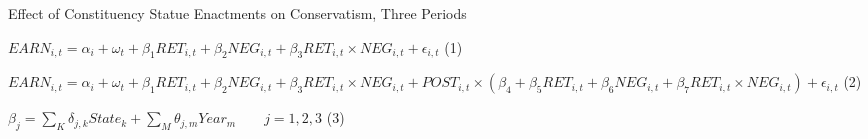 \begin{landscape}
	\begin{table}[H]
		\centering
		\caption{Effect of Constituency Statue Enactments on Conservatism, Three Periods}
		$EARN_{i,t}=\alpha_i+\omega_t+\beta_1RET_{i,t}+\beta_2NEG_{i,t}+\beta_3RET_{i,t}\times NEG_{i,t}+\epsilon_{i,t}$ \qquad \qquad \qquad \qquad \qquad \qquad \qquad \qquad \qquad \qquad \qquad \qquad \qquad \qquad (1)
		
		$EARN_{i,t}=\alpha_i+\omega_t+\beta_1RET_{i,t}+\beta_2NEG_{i,t}+\beta_3RET_{i,t}\times NEG_{i,t}+POST_{i,t}\times (\beta_4+\beta_5RET_{i,t}+\beta_6NEG_{i,t}+\beta_7RET_{i,t}\times NEG_{i,t})+\epsilon_{i,t}$ (2)
		
		$\beta_j=\sum_{K}^{}\delta_{j,k}State_k+\sum_{M}^{}\theta_{j,m}Year_m \qquad j=1,2,3$ \qquad \qquad \qquad \qquad \qquad \qquad \qquad \qquad \qquad \qquad \qquad \qquad \qquad \qquad \qquad \qquad \qquad \quad (3)
		

\end{table}
\end{landscape}
